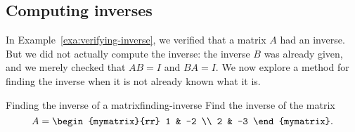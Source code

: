\subsection{Computing inverses}

In Example~\ref{exa:verifying-inverse}, we verified that a matrix $A$
had an inverse. But we did not actually compute the inverse: the
inverse $B$ was already given, and we merely checked that $AB=I$ and
$BA=I$. We now explore a method for finding the inverse when it is not
already known what it is.

\begin{example}{Finding the inverse of a matrix}{finding-inverse}
  Find the inverse of the matrix
  \begin{equation*}
    A=\begin{mymatrix}{rr}
      1 & -2 \\
      2 & -3
    \end{mymatrix}.
  \end{equation*}
\end{example}

